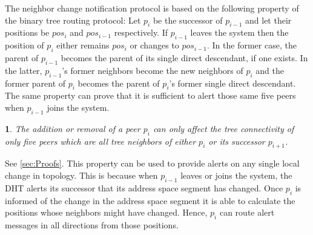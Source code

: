 \documentclass[12pt,english,journal]{elsarticle}
\makeatletter
\numberwithin{equation}{section}
\numberwithin{figure}{section}
\theoremstyle{plain}
\theoremstyle{plain}
\newtheorem{lem}[thm]{\protect\lemmaname}
\newenvironment{proof}[1][\protect\proofname]{\par
\normalfont\topsep6\p@\@plus6\p@\relax
\trivlist
\itemindent\parindent
\item[\hskip\labelsep
\scshape
#1]\ignorespaces
}{\endtrivlist\@endpefalse
}
\providecommand{\proofname}{Proof}
\providecommand{\lemmaname}{Lemma}
\makeatother
\begin{document}
The neighbor change notification protocol is based on the following
property of the binary tree routing protocol: Let $p_{i}$ be the
successor of $p_{i-1}$ and let their positions be $pos_{i}$ and
$pos_{i-1}$ respectively. If $p_{i-1}$ leaves the system then the
position of $p_{i}$ either remains $pos_{i}$ or changes to $pos_{i-1}$.
In the former case, the parent of $p_{i-1}$ becomes the parent of
its single direct descendant, if one exists. In the latter, $p_{i-1}$'s
former neighbors become the new neighbors of $p_{i}$ and the former
parent of $p_{i}$ becomes the parent of $p_{i}$'s former single
direct descendant. The same property can prove that it is sufficient
to alert those same five peers when $p_{i-1}$ joins the system.
\begin{lem}
The addition or removal of a peer $p_{i}$ can only affect the tree
connectivity of only five peers which are all tree neighbors of either
$p_{i}$ or its successor $p_{i+1}$.\end{lem}
\begin{proof}
See \ref{sec:Proofs}.
\end{proof}
This property can be used to provide alerts on any single local change
in topology. This is because when $p_{i-1}$ leaves or joins the system,
the DHT alerts its successor that its address space segment has changed.
Once $p_{i}$ is informed of the change in the address space segment
it is able to calculate the positions whose neighbors might have changed.
Hence, $p_{i}$ can route alert messages in all directions from those
positions.
\end{document}
